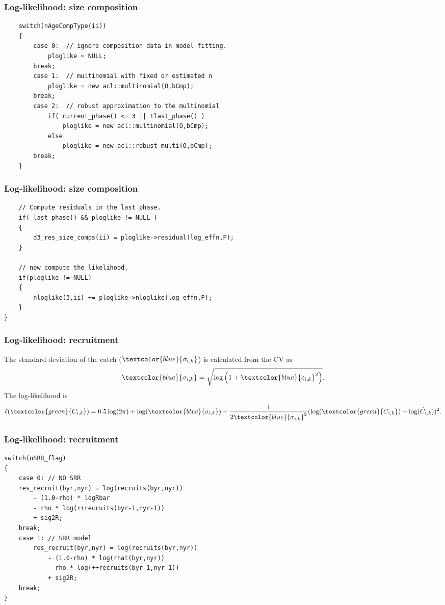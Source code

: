 \documentclass{beamer}
\begin{document}
\begin{frame}[fragile]
\frametitle{Log-likelihood: size composition}
\begin{verbatim}
    switch(nAgeCompType(ii))
    {
        case 0:  // ignore composition data in model fitting.
            ploglike = NULL;
        break;
        case 1:  // multinomial with fixed or estimated n
            ploglike = new acl::multinomial(O,bCmp);
        break;
        case 2:  // robust approximation to the multinomial
            if( current_phase() <= 3 || !last_phase() )
                ploglike = new acl::multinomial(O,bCmp);
            else
                ploglike = new acl::robust_multi(O,bCmp);
        break;
    }
\end{verbatim}
\end{frame}

\begin{frame}[fragile]
\frametitle{Log-likelihood: size composition}
\begin{verbatim}
    // Compute residuals in the last phase.
    if( last_phase() && ploglike != NULL ) 
    {
        d3_res_size_comps(ii) = ploglike->residual(log_effn,P);
    }

    // now compute the likelihood.
    if(ploglike != NULL)
    {
        nloglike(3,ii) += ploglike->nloglike(log_effn,P);			
    }
}
\end{verbatim}
\end{frame}


\begin{frame}
\frametitle{Log-likelihood: recruitment}
The standard deviation of the catch ($\textcolor{blue}{\sigma_{i,k}}$) is calculated
from the CV as
\begin{equation*}
  \textcolor{blue}{\sigma_{i,k}} = \sqrt{\log \left( 1+\textcolor{blue}{c_{i,k}}^2 \right)}.
\end{equation*}
The log-likelihood is
\begin{equation*}
  \ell(\textcolor{green}{C_{i,k}}) = 0.5 \log (2 \pi) + \log
  (\textcolor{blue}{\sigma_{i,k}}) -
  \frac{1}{2\textcolor{blue}{\sigma_{i,k}}^2} (\log (\textcolor{green}{C_{i,k}})
  - \log (\hat{C}_{i,k}))^2.
\end{equation*}
\end{frame}

\begin{frame}[fragile]
\frametitle{Log-likelihood: recruitment}
\begin{verbatim}
switch(nSRR_flag)
{
    case 0: // NO SRR
    res_recruit(byr,nyr) = log(recruits(byr,nyr))
        - (1.0-rho) * logRbar
        - rho * log(++recruits(byr-1,nyr-1)) 
        + sig2R;
    break;
    case 1: // SRR model
        res_recruit(byr,nyr) = log(recruits(byr,nyr))
            - (1.0-rho) * log(rhat(byr,nyr))
            - rho * log(++recruits(byr-1,nyr-1))
            + sig2R;
    break;
}
\end{verbatim}
\end{frame}
\end{document}
